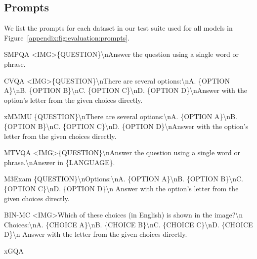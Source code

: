 \subsection{Prompts}
\label{appendix:sec:evaluation:prompts}
%
We list the prompts for each dataset in our test suite used for all models in Figure~\ref{appendix:fig:evaluation:prompts}.
%
\begin{figure*}[ht!]\tiny
    \centering
    \begin{promptbox}{SMPQA}
    <IMG>\{QUESTION\}\textbackslash{n}Answer the question using a single word or phrase.
    \end{promptbox}
    \begin{promptbox}{CVQA}
    <IMG>\{QUESTION\}\textbackslash{n}There are several options:\textbackslash{n}A. \{OPTION A\}\textbackslash{n}B. \{OPTION B\}\textbackslash{n}C. \{OPTION C\}\textbackslash{n}D. \{OPTION D\}\textbackslash{n}Answer with the option's letter from the given choices directly.
    \end{promptbox}
    \begin{promptbox}{xMMMU}
    \{QUESTION\}\textbackslash{n}There are several options:\textbackslash{n}A. \{OPTION A\}\textbackslash{n}B. \{OPTION B\}\textbackslash{n}C. \{OPTION C\}\textbackslash{n}D. \{OPTION D\}\textbackslash{n}Answer with the option's letter from the given choices directly.
    \end{promptbox}
    \begin{promptbox}{MTVQA}
    <IMG>\{QUESTION\}\textbackslash{n}Answer the question using a single word or phrase.\textbackslash{n}Answer in \{LANGUAGE\}.
    \end{promptbox}
    \begin{promptbox}{M3Exam}
    \{QUESTION\}\textbackslash{n}Options:\textbackslash{n}A. \{OPTION A\}\textbackslash{n}B. \{OPTION B\}\textbackslash{n}C. \{OPTION C\}\textbackslash{n}D. \{OPTION D\}\textbackslash{n} Answer with the option's letter from the given choices directly.
    \end{promptbox}
    \begin{promptbox}{BIN-MC}
    <IMG>Which of these choices (in English) is shown in the image?\textbackslash{n} Choices:\textbackslash{n}A. \{CHOICE A\}\textbackslash{n}B. \{CHOICE B\}\textbackslash{n}C. \{CHOICE C\}\textbackslash{n}D. \{CHOICE D\}\textbackslash{n} Answer with the letter from the given choices directly.
    \end{promptbox}
    \begin{promptbox}{xGQA}

\end{promptbox}
\end{figure*}

